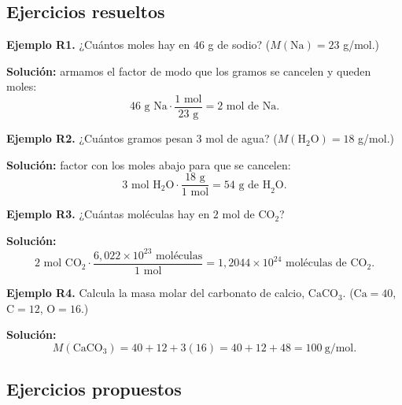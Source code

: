\documentclass[12pt, letterpaper]{article}
\begin{document}
\subsection{Ejercicios resueltos}

\textbf{Ejemplo R1.} ¿Cuántos moles hay en $46$ g de sodio? ($M(\text{Na}) = 23$ g/mol.)

\begin{cuadrosolucion}
  \textbf{Solución:} armamos el factor de modo que los gramos se cancelen y queden moles:
  $$46 \text{ g Na} \cdot \frac{1 \text{ mol}}{23 \text{ g}} = 2 \text{ mol de Na}.$$
\end{cuadrosolucion}

\textbf{Ejemplo R2.} ¿Cuántos gramos pesan $3$ mol de agua? ($M(\text{H}_2\text{O}) = 18$ g/mol.)

\begin{cuadrosolucion}
  \textbf{Solución:} factor con los moles abajo para que se cancelen:
  $$3 \text{ mol H}_2\text{O} \cdot \frac{18 \text{ g}}{1 \text{ mol}} = 54 \text{ g de H}_2\text{O}.$$
\end{cuadrosolucion}

\textbf{Ejemplo R3.} ¿Cuántas moléculas hay en $2$ mol de $\text{CO}_2$?

\begin{cuadrosolucion}
  \textbf{Solución:}
  $$2 \text{ mol CO}_2 \cdot \frac{6{,}022 \times 10^{23} \text{ moléculas}}{1 \text{ mol}} = 1{,}2044 \times 10^{24} \text{ moléculas de CO}_2.$$
\end{cuadrosolucion}

\textbf{Ejemplo R4.} Calcula la masa molar del carbonato de calcio, $\text{CaCO}_3$. ($\text{Ca} = 40$, $\text{C} = 12$, $\text{O} = 16$.)

\begin{cuadrosolucion}
  \textbf{Solución:}
  $$M(\text{CaCO}_3) = 40 + 12 + 3(16) = 40 + 12 + 48 = 100 \ \text{g/mol}.$$
\end{cuadrosolucion}

\subsection{Ejercicios propuestos}
\end{document}
